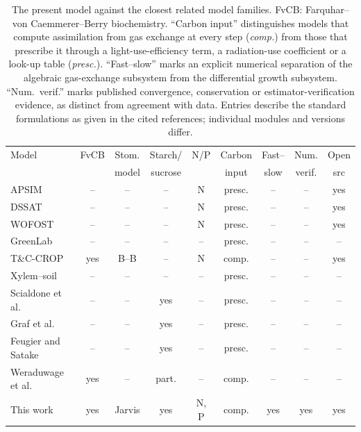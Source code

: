 \begin{table}[!htbp]
\centering
\caption{The present model against the closest related model families. FvCB:
Farquhar--von Caemmerer--Berry biochemistry. ``Carbon input'' distinguishes
models that compute assimilation from gas exchange at every step
(\emph{comp.}) from those that prescribe it through a light-use-efficiency
term, a radiation-use coefficient or a look-up table (\emph{presc.}).
``Fast--slow'' marks an explicit numerical separation of the algebraic
gas-exchange subsystem from the differential growth subsystem. ``Num.\ verif.''
marks published convergence, conservation or estimator-verification evidence,
as distinct from agreement with data. Entries describe the standard
formulations as given in the cited references; individual modules and versions
differ.}
\label{tab:related}
\footnotesize
\setlength{\tabcolsep}{3.5pt}
\begin{tabular}{@{}lcccccccc@{}}
\toprule
Model & FvCB & Stom. & Starch/ & N/P & Carbon & Fast-- & Num. & Open \\
      &      & model & sucrose &     & input  & slow   & verif.& src \\
\midrule
APSIM \cite{Holzworth2014}              & --  & --      & --   & N    & presc. & -- & -- & yes \\
DSSAT \cite{Jones2003}                  & --  & --      & --   & N    & presc. & -- & -- & yes \\
WOFOST \cite{deWit2019}                 & --  & --      & --   & N    & presc. & -- & -- & yes \\
GreenLab \cite{DeReffye2020}            & --  & --      & --   & --   & presc. & -- & -- & -- \\
T\&C-CROP \cite{BuckleyPaules2025}      & yes & B--B    & --   & N    & comp.  & -- & -- & yes \\
Xylem--soil \cite{Janott2011}           & --  & --      & --   & --   & presc. & -- & -- & -- \\
Scialdone et al.\ \cite{Scialdone2013}  & --  & --      & yes  & --   & presc. & -- & -- & -- \\
Graf et al.\ \cite{Graf2010}            & --  & --      & yes  & --   & presc. & -- & -- & -- \\
Feugier and Satake \cite{Feugier2013}   & --  & --      & yes  & --   & presc. & -- & -- & -- \\
Weraduwage et al.\ \cite{Weraduwage2015}& yes & --      & part.& --   & comp.  & -- & -- & -- \\
\midrule
This work                               & yes & Jarvis  & yes  & N, P & comp.  & yes & yes & yes \\
\bottomrule
\end{tabular}
\end{table}

